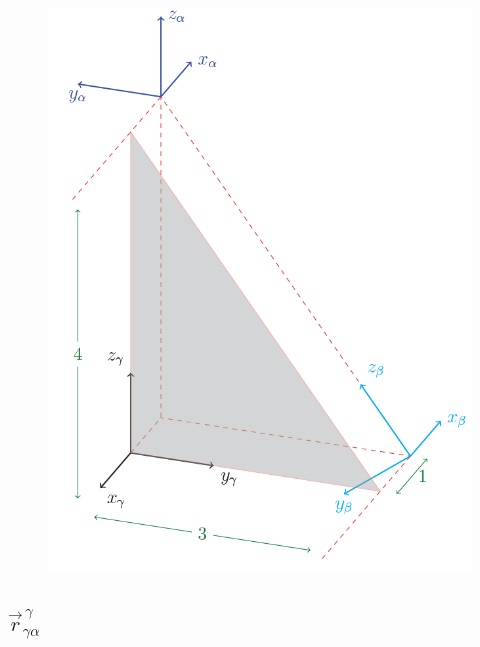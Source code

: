 \documentclass[12pt,letterpaper, onecolumn]{exam}
\begin{document}
\begin{questions}
{\begin{figure}[!h]
            \includegraphics[width=0.85\linewidth]{Q9.png}
        \end{figure}
        \clearpage
        \begin{parts}
            \part{$\vec{r}^{\,\gamma}_{\gamma\alpha}$}


\end{parts}}
\end{questions}
\end{document}

